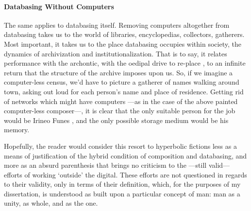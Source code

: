 \paragraph{Databasing Without Computers}
The same applies to databasing itself. Removing computers altogether from databasing takes us to the world of libraries, encyclopedias, collectors, gatherers. Most important, it takes us to the place databasing occupies within society, the dynamics of archivization and institutionalization. That is to say, it relates performance with the archontic, with the oedipal drive to re-place , to an infinite return that the structure of the archive imposes upon us. So, if we imagine a computer-less census, we'd have to picture a gatherer of names walking around town, asking out loud for each person's name and place of residence. Getting rid of networks which might have computers ---as in the case of the above painted computer-less composer---, it is clear that the only suitable person for the job would be Irineo Funes , and the only possible storage medium would be his memory. 

Hopefully, the reader would consider this resort to hyperbolic fictions less as a means of justification of the hybrid condition of composition and databasing, and more as an absurd parenthesis that brings no criticism to the ---still valid--- efforts of working `outside' the digital. These efforts are not questioned in regards to their validity, only in terms of their definition, which, for the purposes of my dissertation, is understood as built upon a particular concept of man: man as a unity, as whole, and as the one.